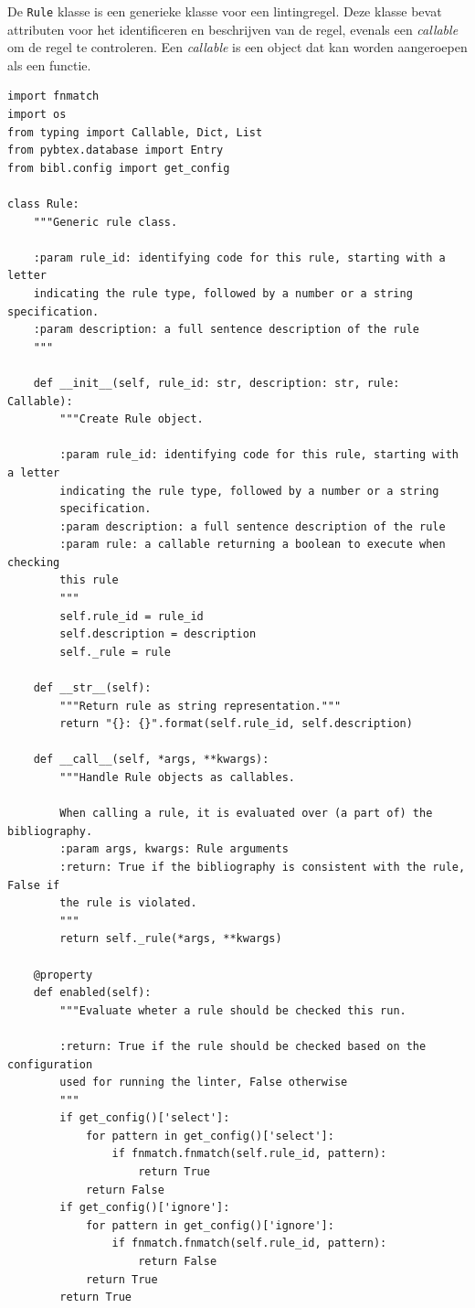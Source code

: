 De \texttt{Rule} klasse is een generieke klasse voor een lintingregel. Deze klasse bevat attributen voor het identificeren en beschrijven van de regel, evenals een \emph{callable} om de regel te controleren. Een \emph{callable} is een object dat kan worden aangeroepen als een functie.

\begin{verbatim}
import fnmatch
import os
from typing import Callable, Dict, List
from pybtex.database import Entry
from bibl.config import get_config

class Rule:
    """Generic rule class.

    :param rule_id: identifying code for this rule, starting with a letter
    indicating the rule type, followed by a number or a string specification.
    :param description: a full sentence description of the rule
    """

    def __init__(self, rule_id: str, description: str, rule: Callable):
        """Create Rule object.

        :param rule_id: identifying code for this rule, starting with a letter
        indicating the rule type, followed by a number or a string
        specification.
        :param description: a full sentence description of the rule
        :param rule: a callable returning a boolean to execute when checking
        this rule
        """
        self.rule_id = rule_id
        self.description = description
        self._rule = rule

    def __str__(self):
        """Return rule as string representation."""
        return "{}: {}".format(self.rule_id, self.description)

    def __call__(self, *args, **kwargs):
        """Handle Rule objects as callables.

        When calling a rule, it is evaluated over (a part of) the bibliography.
        :param args, kwargs: Rule arguments
        :return: True if the bibliography is consistent with the rule, False if
        the rule is violated.
        """
        return self._rule(*args, **kwargs)

    @property
    def enabled(self):
        """Evaluate wheter a rule should be checked this run.

        :return: True if the rule should be checked based on the configuration
        used for running the linter, False otherwise
        """
        if get_config()['select']:
            for pattern in get_config()['select']:
                if fnmatch.fnmatch(self.rule_id, pattern):
                    return True
            return False
        if get_config()['ignore']:
            for pattern in get_config()['ignore']:
                if fnmatch.fnmatch(self.rule_id, pattern):
                    return False
            return True
        return True
\end{verbatim}

